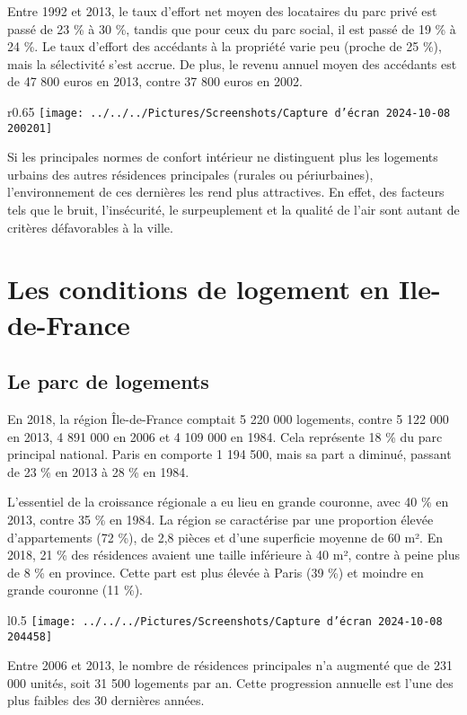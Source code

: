 \documentclass[a4paper, 12pt]{report}
\begin{document}
Entre 1992 et 2013, le taux d'effort net moyen des locataires du parc privé est passé de 23 \% à 30 \%, tandis que pour ceux du parc social, il est passé de 19 \% à 24 \%. Le taux d'effort des accédants à la propriété varie peu (proche de 25 \%), mais la sélectivité s'est accrue. De plus, le revenu annuel moyen des accédants est de 47 800 euros en 2013, contre 37 800 euros en 2002.
\newpage
\begin{wrapfigure}{r}{0.65\textwidth}
	\centering
	\texttt{[image: ../../../Pictures/Screenshots/Capture d'écran 2024-10-08 200201]}
\end{wrapfigure}
Si les principales normes de confort intérieur ne distinguent plus les logements urbains des autres résidences principales (rurales ou périurbaines), l'environnement de ces dernières les rend plus attractives. En effet, des facteurs tels que le bruit, l'insécurité, le surpeuplement et la qualité de l'air sont autant de critères défavorables à la ville.

\section{Les conditions de logement en Ile-de-France}

\subsection{Le parc de logements}

En 2018, la région Île-de-France comptait 5 220 000 logements, contre 5 122 000 en 2013, 4 891 000 en 2006 et 4 109 000 en 1984. Cela représente 18 \% du parc principal national. Paris en comporte 1 194 500, mais sa part a diminué, passant de 23 \% en 2013 à 28 \% en 1984. 

L'essentiel de la croissance régionale a eu lieu en grande couronne, avec 40 \% en 2013, contre 35 \% en 1984. La région se caractérise par une proportion élevée d'appartements (72 \%), de 2,8 pièces et d'une superficie moyenne de 60 m². En 2018, 21 \% des résidences avaient une taille inférieure à 40 m², contre à peine plus de 8 \% en province. Cette part est plus élevée à Paris (39 \%) et moindre en grande couronne (11 \%).
\newpage
\begin{wrapfigure}{l}{0.5\textwidth}
	\centering
	\texttt{[image: ../../../Pictures/Screenshots/Capture d'écran 2024-10-08 204458]}
\end{wrapfigure}
Entre 2006 et 2013, le nombre de résidences principales n’a augmenté que de 231 000 unités, soit 31 500 logements par an. Cette progression annuelle est l’une des plus faibles des 30 dernières années. 
\end{document}
